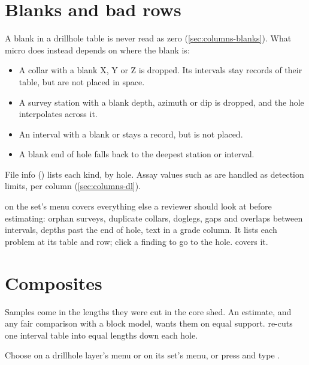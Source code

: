 \section{Blanks and bad rows}\label{sec:dh-blanks}

A blank in a drillhole table is never read as zero (\cref{sec:columns-blanks}). What micro does instead depends on where the blank is:

\begin{itemize}
\item A collar with a blank X, Y or Z is dropped. Its intervals stay records of their table, but are not placed in space.
\item A survey station with a blank depth, azimuth or dip is dropped, and the hole interpolates across it.
\item An interval with a blank  or  stays a record, but is not placed.
\item A blank end of hole falls back to the deepest station or interval.
\end{itemize}

File info () lists each kind, by hole. Assay values such as  are handled as detection limits, per column (\cref{sec:columns-dl}).

 on the set's menu covers everything else a reviewer should look at before estimating: orphan surveys, duplicate collars, doglegs, gaps and overlaps between intervals, depths past the end of hole, text in a grade column. It lists each problem at its table and row; click a finding to go to the hole.  covers it.

\section{Composites}\label{sec:dh-composites}

Samples come in the lengths they were cut in the core shed. An estimate, and any fair comparison with a block model, wants them on equal support.  re-cuts one interval table into equal lengths down each hole.

Choose  on a drillhole layer's menu or on its set's menu, or press  and type .

